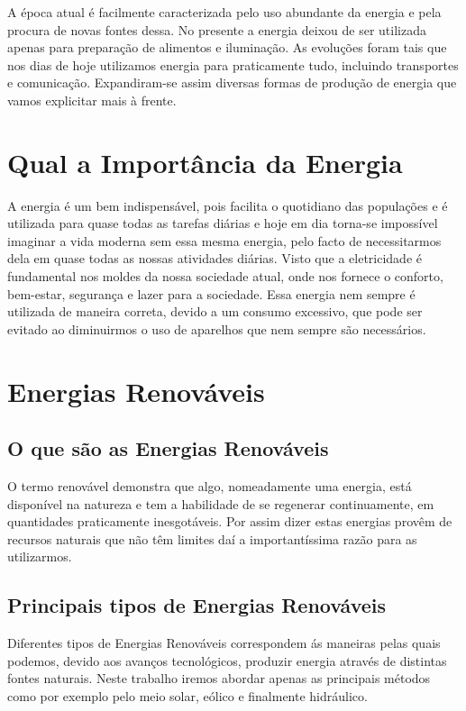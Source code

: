 \documentclass{report}
\begin{document}
A época atual é facilmente caracterizada pelo uso abundante da energia e pela procura de novas fontes dessa. No presente a energia deixou de ser utilizada apenas para preparação de alimentos e iluminação.  As evoluções foram tais que nos dias de hoje utilizamos energia para praticamente tudo, incluindo transportes e comunicação. 
Expandiram-se assim diversas formas de produção de energia que vamos explicitar mais à frente.



\chapter{Qual a Importância da Energia}
A energia é um bem indispensável, pois facilita o quotidiano das populações e é utilizada para quase todas as tarefas diárias e hoje em dia torna-se impossível imaginar a vida moderna sem essa mesma energia, pelo facto de necessitarmos dela em quase todas as nossas atividades diárias. Visto que a eletricidade é fundamental nos moldes da nossa sociedade atual, onde nos fornece o conforto, bem-estar, segurança e lazer para a sociedade.
Essa energia nem sempre  é utilizada de maneira correta, devido a um consumo excessivo, que pode ser evitado ao diminuirmos o uso de aparelhos que nem sempre são necessários. 



\chapter{Energias Renováveis}
\section{O que são as Energias Renováveis}
O termo renovável demonstra que algo, nomeadamente uma energia, está disponível na natureza e tem a habilidade de se regenerar continuamente, em quantidades praticamente inesgotáveis. Por assim dizer estas energias provêm de recursos naturais que não têm limites daí a importantíssima razão para as utilizarmos.



\section{Principais tipos de Energias Renováveis}
Diferentes tipos de Energias Renováveis correspondem ás maneiras pelas quais podemos, devido aos avanços tecnológicos, produzir energia através de distintas fontes naturais. Neste trabalho iremos abordar apenas as principais métodos como por exemplo pelo meio solar, eólico e finalmente hidráulico.
\end{document}
